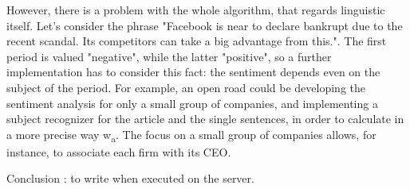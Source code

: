 However, there is a problem with the whole algorithm, that regards linguistic itself. Let's consider the phrase "Facebook is near to declare bankrupt due to the recent scandal. Its competitors can take a big advantage from this.". The first period is valued "negative", while the latter "positive", so a further implementation has to consider this fact: the sentiment depends even on the subject of the period. For example, an open road could be developing the sentiment analysis for only a small group of companies, and implementing a subject recognizer for the article and the single sentences, in order to calculate in a more precise way w\textsubscript{a}. The focus on a small group of companies allows, for instance, to associate each firm with its CEO.  
\par
Conclusion : to write when executed on the server.